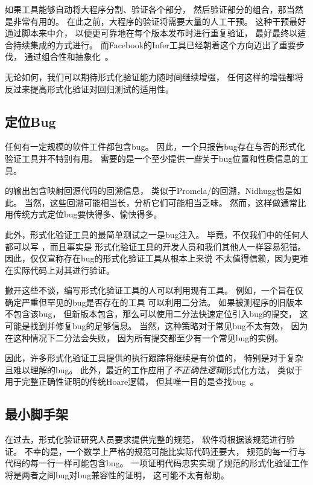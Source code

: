 如果工具能够自动将大程序分割、验证各个部分，
然后验证部分的组合，那当然是非常有用的。
在此之前，大程序的验证将需要大量的人工干预。
这种干预最好通过脚本来中介，
以便更可靠地在每个版本发布时进行重复验证，
最好最终以适合持续集成的方式进行。
而Facebook的Infer工具已经朝着这个方向迈出了重要步伐，
通过组合性和抽象化~\cite{SamBlackshear2018RacerD,DinoDistefano2019FBstaticAnalysis}。

无论如何，我们可以期待形式化验证能力随时间继续增强，
任何这样的增强都将反过来提高形式化验证对回归测试的适用性。

\subsection{定位Bug}
\label{sec:future:Locate Bugs}

任何有一定规模的软件工件都包含bug。
因此，一个只报告bug存在与否的形式化验证工具并不特别有用。
需要的是一个至少提供\emph{一些}关于bug位置和性质信息的工具。

的输出包含映射回源代码的回溯信息，
类似于Promela/的回溯，Nidhugg也是如此。
当然，这些回溯可能相当长，分析它们可能相当乏味。
然而，这样做通常比用传统方式定位bug要快得多、愉快得多。

此外，形式化验证工具的最简单测试之一是bug注入。
毕竟，不仅我们中的任何人都可以写
，而且事实是
形式化验证工具的开发人员和我们其他人一样容易犯错。
因此，仅仅宣称存在bug的形式化验证工具从根本上来说
不太值得信赖，因为更难在实际代码上对其进行验证。

撇开这些不谈，编写形式化验证工具的人可以利用现有工具。
例如，一个旨在仅确定严重但罕见的bug是否存在的工具
可以利用二分法。
如果被测程序的旧版本不包含该bug，
但新版本包含，那么可以使用二分法快速定位引入bug的提交，
这可能是找到并修复bug的足够信息。
当然，这种策略对于常见bug不太有效，
因为在这种情况下二分法会失败，
因为所有提交都至少有一个常见bug的实例。

因此，许多形式化验证工具提供的执行跟踪将继续是有价值的，
特别是对于复杂且难以理解的bug。
此外，最近的工作应用了\emph{不正确性逻辑}形式化方法，
类似于用于完整正确性证明的传统Hoare逻辑，
但其唯一目的是查找bug~\cite{PeterWOHearn2019incorrectnessLogic}。

\subsection{最小脚手架}
\label{sec:future:Minimal Scaffolding}

在过去，形式化验证研究人员要求提供完整的规范，
软件将根据该规范进行验证。
不幸的是，一个数学上严格的规范可能比实际代码还要大，
规范的每一行与代码的每一行一样可能包含bug。
一项证明代码忠实实现了规范的形式化验证工作
将是两者之间bug对bug兼容性的证明，
这可能不太有帮助。

